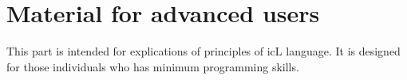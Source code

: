 \part{Material for advanced users}

This part is intended for explications of principles of icL language. It is designed for those individuals who has minimum programming skills.
